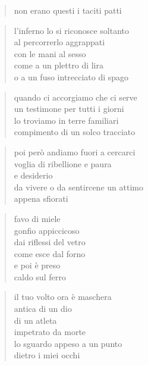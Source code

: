	\begin{verse}
		non erano questi i taciti patti
	\end{verse}

\clearpage


	\begin{verse}
		l'inferno lo si riconosce soltanto\\
		al percorrerlo aggrappati\\
		con le mani al sesso\\
		come a un plettro di lira\\
		o a un fuso intrecciato di spago
	\end{verse}

\clearpage


	\begin{verse}
		quando ci accorgiamo che ci serve\\
		un testimone per tutti i giorni\\
		lo troviamo in terre familiari\\
		compimento di un solco tracciato
	\end{verse}

	\begin{verse}
		poi però andiamo fuori a cercarci\\
		voglia di ribellione e paura\\
		e desiderio\\
		da vivere o da sentircene un attimo\\
		appena sfiorati
	\end{verse}

\clearpage


	\begin{verse}
		favo di miele\\
		gonfio appiccicoso\\
		dai riflessi del vetro\\
		come esce dal forno\\
		e poi è preso\\
		caldo sul ferro
	\end{verse}

	\begin{verse}
		il tuo volto ora è maschera\\
		antica di un dio\\
		di un atleta\\
		impetrato da morte\\
		lo sguardo appeso a un punto\\
		dietro i miei occhi
	\end{verse}


